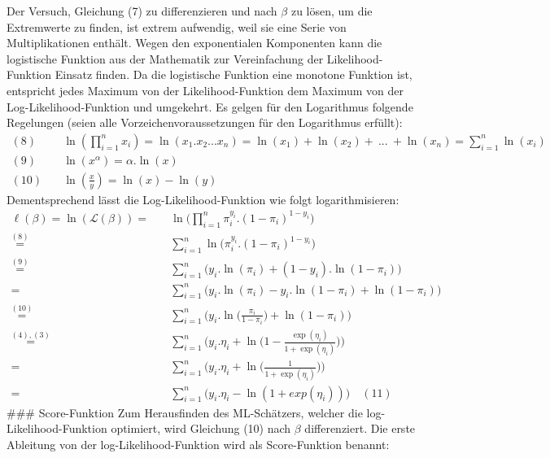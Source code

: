 \documentclass[12pt,]{article}
\begin{document}
Der Versuch, Gleichung (7) zu differenzieren und nach \(\beta\) zu
lösen, um die Extremwerte zu finden, ist extrem aufwendig, weil sie eine
Serie von Multiplikationen enthält. Wegen den exponentialen Komponenten
kann die logistische Funktion aus der Mathematik zur Vereinfachung der
Likelihood-Funktion Einsatz finden. Da die logistische Funktion eine
monotone Funktion ist, entspricht jedes Maximum von der
Likelihood-Funktion dem Maximum von der Log-Likelihood-Funktion und
umgekehrt. Es gelgen für den Logarithmus folgende Regelungen (seien alle
Vorzeichenvoraussetzungen für den Logarithmus erfüllt): \[
\begin{aligned}
(8) \quad &\ln(\prod_{i=1}^{n}x_i) = \ln(x_1.x_2...x_n) = \ln(x_1) + \ln(x_2) + \ ... \ + \ln(x_n) = \sum_{i=1}^{n} \ln(x_i) \\
(9) \quad &\ln(x^\alpha) = \alpha.\ln(x) \\
(10) \quad &\ln(\frac{x}{y}) = \ln(x) - \ln(y)
\end{aligned} 
\] Dementsprechend lässt die Log-Likelihood-Funktion wie folgt
logarithmisieren: \[
\begin{aligned}
\ell(\beta) = \ln(\mathcal{L}(\beta)) = \quad &\ln \Bigg( \prod_{i=1}^{n} \pi_i^{y_i}.(1-\pi_i)^{1-y_i} \Bigg) \\
\mathrel{\overset{(8)}{=}} \quad &\sum_{i = 1}^{n} \ln \Big(\pi_i^{y_i}.(1-\pi_i)^{1-y_i}\Big) \\
\mathrel{\overset{(9)}{=}} \quad &\sum_{i = 1}^{n} \Big( y_i.\ln(\pi_i) + (1-y_i).\ln(1-\pi_i) \Big) \\
= \quad &\sum_{i = 1}^{n} \Big( y_i.\ln(\pi_i) - y_i.\ln(1-\pi_i) + \ln(1-\pi_i) \Big) \\
\mathrel{\overset{(10)}{=}} \quad &\sum_{i = 1}^{n} \Bigg( y_i.\ln \Big(\frac{\pi_i}{1-\pi_i}\Big) + \ln(1-\pi_i) \Bigg) \\
\mathrel{\overset{(4),(3)}{=}} \ &\sum_{i = 1}^{n} \Bigg( y_i.\eta_i + \ln \Big( 1- \frac{\exp(\eta_i)}{1 + \exp(\eta_i)} \Big) \Bigg) \\
= \quad &\sum_{i = 1}^{n} \Bigg( y_i.\eta_i + \ln \Big( \frac{1}{1+\exp(\eta_i)}\Big) \Bigg) \\
= \quad &\sum_{i = 1}^{n} \Big( y_i.\eta_i - \ln (1 + exp(\eta_i)) \Big) \quad (11)
\end{aligned}
\] \#\#\# Score-Funktion Zum Herausfinden des ML-Schätzers, welcher die
log-Likelihood-Funktion optimiert, wird Gleichung (10) nach \(\beta\)
differenziert. Die erste Ableitung von der log-Likelihood-Funktion wird
als Score-Funktion benannt:
\end{document}
